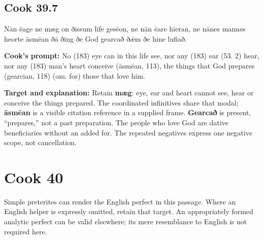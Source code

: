 \par\begin{minipage}{\linewidth}\raggedright
\subsection*{Cook 39.7}

Nān ēage ne mæg on ðissum līfe gesēon, ne nān ēare hīeran, ne nānes mannes heorte āsmēan ðā ðing ðe God gearcað ðǣm ðe hine lufiað.

\textbf{Cook's prompt:} No (183) eye can in this life see, nor any (183) ear (53. 2) hear, nor any (183) man’s heart conceive (āsmēan, 113), the things that God prepares (gearcian, 118) (om. for) those that love him.

\textbf{Target and explanation:} Retain \textbf{mæg}: eye, ear and heart cannot see, hear or conceive the things prepared. The coordinated infinitives share that modal; \textbf{āsmēan} is a visible citation reference in a supplied frame. \textbf{Gearcað} is present, “prepares,” not a past preparation. The people who love God are dative beneficiaries without an added for. The repeated negatives express one negative scope, not cancellation.

\end{minipage}\par\addvspace{4pt}

\clearpage
\section*{Cook 40}

Simple preterites can render the English perfect in this passage. Where an English helper is expressly omitted, retain that target. An appropriately formed analytic perfect can be valid elsewhere; its mere resemblance to English is not required here.

